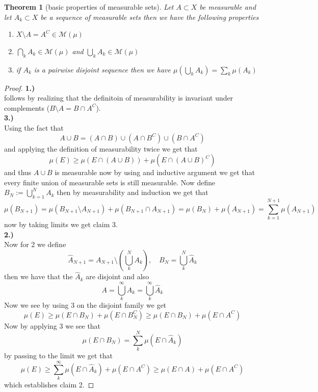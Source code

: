 \documentclass[11pt,a4paper]{article}
\newcommand{\cM}{\mathcal{M}}
\theoremstyle{plain}
\newtheorem{theorem}{Theorem}[section]
\theoremstyle{definition}
\begin{document}
\begin{theorem}[basic properties of measurable sets]
    Let $A \subset X$ be measurable and let $A_k \subset X$ be a sequence of measurable sets then 
    we have the following properties 
    \begin{enumerate}
        \item $X\setminus A = A^C \in \cM(\mu)$
        \item $\bigcap_k A_k \in \cM(\mu)$ and $\bigcup_k A_k \in \cM(\mu)$
        \item if $A_k$ is a pairwise disjoint sequence then we have $\mu(\bigcup_k A_k) = \sum_k \mu(A_k)$
    \end{enumerate}
\end{theorem}
\begin{proof}
    \textbf{1.)}\\ follows by realizing that the definitoin of measurability is invariant under complements ($B\setminus A = B \cap A^C$).
    \\
    \textbf{3.)}\\
    Using the fact that 
    \[
        A \cup B = (A \cap B) \cup (A \cap B^C) \cup (B \cap A^C)
    \]
    and applying the definition  of measurability twice we get that 
    \[
        \mu(E) \ge \mu(E \cap (A \cup B)) + \mu(E \cap (A \cup B)^C)
    \]
    and thus $A \cup B$ is measurable now by using and inductive argument we get that every finite union of measurable sets is still measurable.
    Now define $B_N := \bigcup_{k=1}^N A_k$ then by measurability and induction we get that 
    \[
        \mu(B_{N+1}) = \mu(B_{N+1}\setminus A_{N+1}) + \mu(B_{N+1} \cap A_{N+1}) = \mu(B_N) + \mu(A_{N+1}) = \sum_{k = 1}^{N+1} \mu(A_{N+1})
    \]
    now by taking limits we get claim 3. 
    \\
    \textbf{2.)}\\
    Now for 2 we  define 
    \[
        \hat{A}_{N+1} = A_{N+1}\setminus (\bigcup_k^N A_k), \quad B_N = \bigcup^N_k \hat{A}_k
    \]
    then we have that the $\hat{A}_k$ are disjoint and also 
    \[
        A = \bigcup_k^\infty A_k = \bigcup_k^\infty \hat{A}_k
    \]
    Now we see by using 3 on the disjoint family we get 
    \[
        \mu(E) \ge \mu(E \cap B_N) + \mu(E \cap B_N^C) \ge \mu(E \cap B_N) + \mu(E \cap A^C)
    \]
    Now by applying 3 we see that 
    \[
        \mu(E \cap B_N) = \sum_k^N \mu(E \cap \hat{A}_k) 
    \]
    by passing to the limit we get that 
    \[
        \mu(E) \ge \sum_k^\infty \mu(E \cap \hat{A}_k) + \mu(E \cap A^C) \ge \mu(E \cap A) + \mu(E \cap A^C)
    \]
    which establishes claim 2.
\end{proof}
\end{document}
